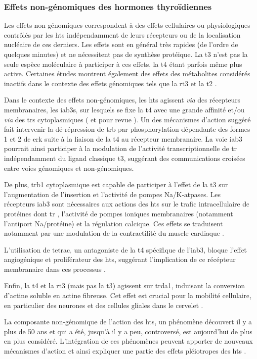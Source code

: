 \documentclass[../main.tex]{subfiles}
\begin{document}
\subsubsection{Effets non-génomiques des hormones thyroïdiennes}
Les effets non-génomiques correspondent à des effets cellulaires ou physiologiques contrôlés par les \glspl{ht} indépendamment de leurs récepteurs ou de la localisation nucléaire de ces derniers.
Les effets sont en général très rapides (de l'ordre de quelques minutes) et ne nécessitent pas de synthèse protéique.
La \gls{t3} n'est pas la seule espèce moléculaire à participer à ces effets, la \gls{t4} étant parfois même plus active.
Certaines études montrent également des effets des métabolites considérés inactifs dans le contexte des effets génomiques tels que la \gls{rt3} \citep{Siegrist-Kaiser1990} et la \gls{t2} \citep{Lombardi1998}.
\par
Dans le contexte des effets non-génomiques, les \glspl{ht} agissent \textit{via} des récepteurs membranaires, les \glspl{iab3}, sur lesquels se fixe la \gls{t4} avec une grande affinité et/ou \textit{via} des \glspl{tr} cytoplasmiques (\citealp{Bergh2005} et pour revue \citealp{Davis2008}).
Un des mécanismes d'action suggéré fait intervenir la dé-répression de \gls{trb} par phosphorylation dépendante des formes 1 et 2 de \gls{erk} \citep{Davis2000} suite à la liaison de la \gls{t4} au récepteur membranaire.
La voie \gls{iab3} pourrait ainsi participer à la modulation de l'activité transcriptionnelle de \gls{tr} indépendamment du ligand classique \gls{t3}, suggérant des communications croisées entre voies génomiques et non-génomiques.
\par
De plus, \gls{trb}1 cytoplasmique est capable de participer à l'effet de la \gls{t3} sur l'augmentation de l'insertion et l'activité de pompes \gls{Na}/\gls{K}-\gls{atp}ases.
Les récepteurs \gls{iab3} sont nécessaires aux actions des \glspl{ht} sur le trafic intracellulaire de protéines dont \gls{tr} \citep{Davis2005}, l'activité de pompes ioniques membranaires (notamment l'antiport \gls{Na}/protéine) et la régulation calcique.
Ces effets se traduisent notamment par une modulation de la contractilité du muscle cardiaque \citep{Davis2002}.
\par
L'utilisation de \gls{tetrac}, un antagoniste de la \gls{t4} spécifique de l'\gls{iab3}, bloque l'effet angiogénique et proliférateur des \glspl{ht}, suggérant l'implication de ce récépteur membranaire dans ces processus \citep{Davis2011}.
\par
Enfin, la \gls{t4} et la \gls{rt3} (mais pas la \gls{t3}) agissent sur \gls{trda}1, induisant la conversion d'actine soluble en actine fibreuse.
Cet effet est crucial pour la mobilité cellulaire, en particulier des neurones et des cellules gliales dans le cervelet \citep{Safran1993,Leonard2006}.
\par
La composante non-génomique de l'action des \glspl{ht}, un phénomène découvert il y a plus de 50 ans et qui a été, jusqu'à il y a peu, controversé, est aujourd'hui de plus en plus considéré.
L'intégration de ces phénomènes peuvent apporter de nouveaux mécanismes d'action et ainsi expliquer une partie des effets pléiotropes des \glspl{ht} \citep{Brix2011}.
\end{document}
